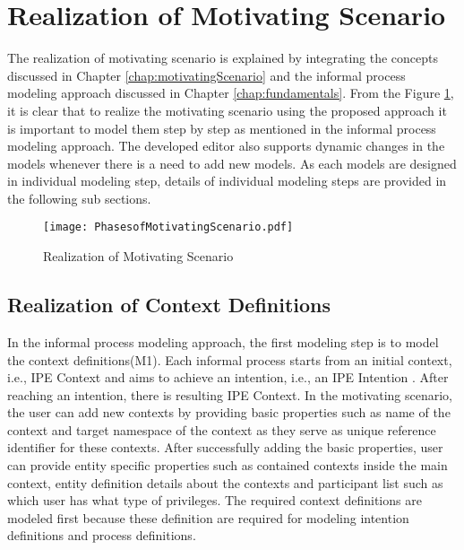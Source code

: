 \section{Realization of Motivating Scenario}
\label{sec:realization}
The realization of motivating scenario is explained by integrating the concepts discussed in Chapter \ref{chap:motivatingScenario} and the informal process modeling approach discussed in Chapter \ref{chap:fundamentals}. From the Figure \ref{fig:realizationofmotivatingscenario}, it is clear that to realize the motivating scenario using the proposed approach it is important to model them step by step as mentioned in the informal process modeling approach. The developed editor also supports dynamic changes in the models whenever there is a need to add new models. As each models are designed in individual modeling step, details of individual modeling steps are provided in the following sub sections. 

\begin{figure}
	\centering
	\texttt{[image: PhasesofMotivatingScenario.pdf]}
	\caption{Realization of Motivating Scenario}
	\label{fig:realizationofmotivatingscenario}
\end{figure}

\subsection{Realization of Context Definitions}
In the informal process modeling approach, the first modeling step is to model the context definitions(M1). Each informal process starts from an initial context, i.e., IPE Context and aims to achieve an intention, i.e., an IPE Intention \cite{Sungur2014a}. After reaching an intention, there is resulting IPE Context. In the motivating scenario, the user can add new contexts by providing basic properties such as name of the context and target namespace of the context as they serve as unique reference identifier for these contexts. After successfully adding the basic properties, user can provide entity specific properties such as contained contexts inside the main context, entity definition details about the contexts and participant list such as which user has what type of privileges. The required context definitions are modeled first because these definition are required for modeling intention definitions and process definitions.  

